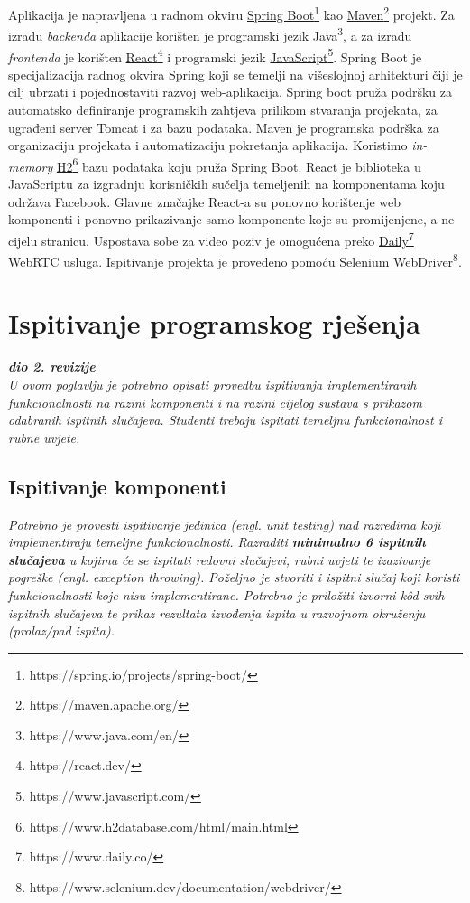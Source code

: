 			\indent Aplikacija je napravljena u radnom okviru \href{https://spring.io/projects/spring-boot/}{Spring Boot\footnote{https://spring.io/projects/spring-boot/}} kao \href{https://maven.apache.org/}{Maven\footnote{https://maven.apache.org/}} projekt. Za izradu \textit{backenda} aplikacije korišten je programski jezik \href{https://www.java.com/en/}{Java\footnote{https://www.java.com/en/}}, a za izradu \textit{frontenda} je korišten \href{https://react.dev/}{React\footnote{https://react.dev/}} i programski jezik \href{https://www.javascript.com/}{JavaScript\footnote{https://www.javascript.com/}}. Spring Boot je specijalizacija radnog okvira Spring koji se temelji na višeslojnoj arhitekturi čiji je cilj ubrzati i pojednostaviti razvoj web-aplikacija. Spring boot pruža podršku za automatsko definiranje programskih zahtjeva prilikom stvaranja projekata, za ugrađeni server Tomcat i za bazu podataka. Maven je programska podrška za organizaciju projekata i automatizaciju pokretanja aplikacija. Koristimo \textit{in-memory} \href{https://www.h2database.com/html/main.html}{H2\footnote{https://www.h2database.com/html/main.html}} bazu podataka koju pruža Spring Boot. React je biblioteka u JavaScriptu za izgradnju korisničkih sučelja temeljenih na komponentama koju održava Facebook. Glavne značajke React-a su ponovno korištenje web komponenti i ponovno prikazivanje samo komponente koje su promijenjene, a ne cijelu stranicu. Uspostava sobe za video poziv je omogućena preko \href{https://www.daily.co/}{Daily\footnote{https://www.daily.co/}} WebRTC usluga. Ispitivanje projekta je provedeno pomoću \href{https://www.selenium.dev/documentation/webdriver/}{Selenium WebDriver\footnote{https://www.selenium.dev/documentation/webdriver/}}.

		\eject 
		
	
		\section{Ispitivanje programskog rješenja}
			
			\textbf{\textit{dio 2. revizije}}\\
			
			 \textit{U ovom poglavlju je potrebno opisati provedbu ispitivanja implementiranih funkcionalnosti na razini komponenti i na razini cijelog sustava s prikazom odabranih ispitnih slučajeva. Studenti trebaju ispitati temeljnu funkcionalnost i rubne uvjete.}
	
			
			\subsection{Ispitivanje komponenti}
			\textit{Potrebno je provesti ispitivanje jedinica (engl. unit testing) nad razredima koji implementiraju temeljne funkcionalnosti. Razraditi \textbf{minimalno 6 ispitnih slučajeva} u kojima će se ispitati redovni slučajevi, rubni uvjeti te izazivanje pogreške (engl. exception throwing). Poželjno je stvoriti i ispitni slučaj koji koristi funkcionalnosti koje nisu implementirane. Potrebno je priložiti izvorni kôd svih ispitnih slučajeva te prikaz rezultata izvođenja ispita u razvojnom okruženju (prolaz/pad ispita). }
			
